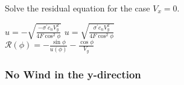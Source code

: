 \begin{algorithm}[htbp]
\caption{Solve the residual equation for the case $V_x = 0$.}
\begin{algorithmic}


    \State $u = -\sqrt{\frac{-\sigma^\prime c_n V_y^2}{4 F \cos^2\phi}}$
\Else
    \State $u = \sqrt{\frac{\sigma^\prime c_n V_y^2}{4 F \cos^2\phi}}$
\EndIf
\\
\State $\mathcal{R}(\phi) = - \frac{\sin\phi}{u(\phi)} - \frac{\cos\phi}{V_y}$
\end{algorithmic}
\label{alg:Vx0}
\end{algorithm}

%
%
%
%
%
%
%

\subsubsection{No Wind in the y-direction}

